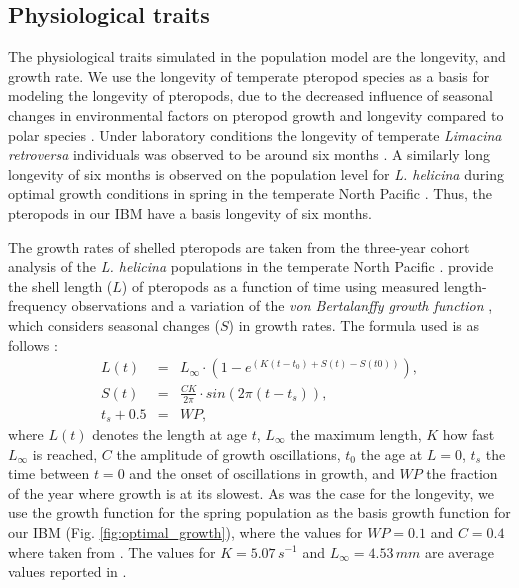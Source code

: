 \subsection{Physiological traits} \label{sec:physiological_traits}
The physiological traits simulated in the population model are the longevity, and growth rate. We use the longevity of temperate pteropod species as a basis for modeling the longevity of pteropods, due to the decreased influence of seasonal changes in environmental factors \citep[e.g. temperature and food availability; ][]{Bednarsek2012PteropodDistribution,Wang2017Lifecycle} on pteropod growth and longevity compared to polar species \citep{Manno2017ReviewPteropodVulnerability}. Under laboratory conditions the longevity of temperate \textit{Limacina retroversa} individuals was observed to be around six months \citep{Thabet2015Lifestages}. A similarly long longevity of six months is observed on the population level for \textit{L. helicina} during optimal growth conditions in spring in the temperate North Pacific \citep{Wang2017Lifecycle}. Thus, the pteropods in our IBM have a basis longevity of six months.

The growth rates of shelled pteropods are taken from the three-year cohort analysis of the \textit{L. helicina} populations in the temperate North Pacific \citep{Wang2017Lifecycle}. \cite{Wang2017Lifecycle} provide the shell length ($L$) of pteropods as a function of time using measured length-frequency observations and a variation of the \textit{von Bertalanffy growth function} \citep[VBGF; ][]{Bertalanffy1938}, which considers seasonal changes ($S$) in growth rates. The formula used is as follows \citep{Somers1988,Wang2017Lifecycle}:
\begin{eqnarray}
L(t) & = & L_{\infty} \cdot (1 - e^{(K(t-t_0) + S(t) - S(t0))}), \\
S(t) & = & \frac{CK}{2\pi} \cdot sin(2\pi (t-t_s)), \\
t_s + 0.5 & = & WP,
\end{eqnarray}
\noindent
where $L(t)$ denotes the length at age $t$, $L_{\infty}$ the maximum length, $K$ how fast $L_{\infty}$ is reached, $C$ the amplitude of growth oscillations, $t_0$ the age at $L=0$, $t_s$ the time between $t=0$ and the onset of oscillations in growth, and $WP$ the fraction of the year where growth is at its slowest. As was the case for the longevity, we use the growth function for the spring population as the basis growth function for our IBM (Fig. \ref{fig:optimal_growth}), where the values for $WP=0.1$ and $C=0.4$ where taken from \cite{Wang2017Lifecycle}. The values for $K=5.07\, s^{-1}$ and $L_{\infty} = 4.53\, mm$ are average values reported in \cite{Wang2017Lifecycle}.


